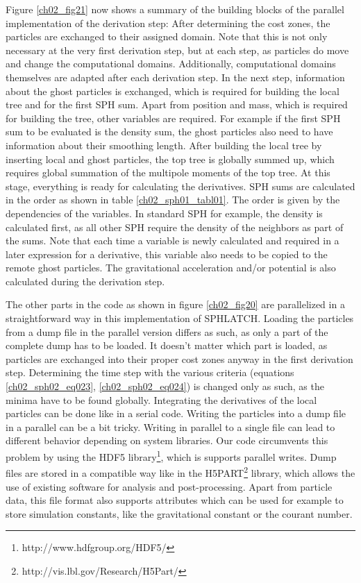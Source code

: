 Figure \ref{ch02_fig21} now shows a summary of the building blocks of the parallel implementation of the derivation step: After determining the cost zones, the particles are exchanged to their assigned domain. Note that this is not only necessary at the very first derivation step, but at each step, as particles do move and change the computational domains. Additionally, computational domains themselves are adapted after each derivation step. In the next step, information about the ghost particles is exchanged, which is required for building the local tree and for the first SPH sum. Apart from position and mass, which is required for building the tree, other variables are required. For example if the first SPH sum to be evaluated is the density sum, the ghost particles also need to have information about their smoothing length. After building the local tree by inserting local and ghost particles, the top tree is globally summed up, which requires global summation of the multipole moments of the top tree. At this stage, everything is ready for calculating the derivatives. SPH sums are calculated in the order as shown in table \ref{ch02_sph01_tabl01}. The order is given by the dependencies of the variables. In standard SPH for example, the density is calculated first, as all other SPH require the density of the neighbors as part of the sums. Note that each time a variable is newly calculated and required in a later expression for a derivative, this variable also needs to be copied to the remote ghost particles. The gravitational acceleration and/or potential is also calculated during the derivation step.

The other parts in the code as shown in figure \ref{ch02_fig20} are parallelized in a straightforward way in this implementation of SPHLATCH. Loading the particles from a dump file in the parallel version differs as such, as only a part of the complete dump has to be loaded. It doesn't matter which part is loaded, as particles are exchanged into their proper cost zones anyway in the first derivation step. Determining the time step with the various criteria (equations \ref{ch02_sph02_eq023}, \ref{ch02_sph02_eq024}) is changed only as such, as the minima have to be found globally. Integrating the derivatives of the local particles can be done like in a serial code. Writing the particles into a dump file in a parallel can be a bit tricky. Writing in parallel to a single file can lead to different behavior depending on system libraries. Our code circumvents this problem by using the HDF5 library\footnote{http://www.hdfgroup.org/HDF5/}, which is supports parallel writes. Dump files are stored in a compatible way like in the H5PART\footnote{http://vis.lbl.gov/Research/H5Part/} library, which allows the use of existing software for analysis and post-processing. Apart from particle data, this file format also supports attributes which can be used for example to store simulation constants, like the gravitational constant or the courant number.


